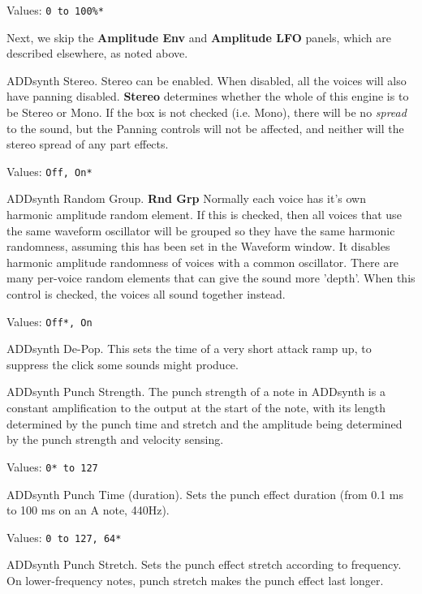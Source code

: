 
   Values: \texttt{0 to 100\%* }

   Next, we skip the \textbf{Amplitude Env} and \textbf{Amplitude LFO}
   panels, which are described elsewhere, as noted above.

   ADDsynth Stereo.
   Stereo can be enabled.
   When disabled, all the voices will also have panning disabled.
   \textbf{Stereo} determines whether the whole of this engine is to be Stereo or
   Mono. If the box is not checked (i.e. Mono), there will be no \textsl{spread}
   to the sound, but the Panning controls will not be affected, and neither will
   the stereo spread of any part effects.

   Values: \texttt{Off, On*}

   ADDsynth Random Group.
   \textbf{Rnd Grp} Normally each voice has it's own harmonic amplitude
   random element. If this is checked, then all voices that use the same waveform
   oscillator will be grouped so they have the same harmonic randomness, assuming
   this has been set in the Waveform window.
   It disables harmonic amplitude randomness of voices with a common oscillator.
   There are many per-voice random elements that can give the sound more
   'depth'. When this control is checked, the voices all sound together
   instead.

   Values: \texttt{Off*, On}

   ADDsynth De-Pop.
   This sets the time of a very short attack ramp up,
   to suppress the click some sounds might produce.

   ADDsynth Punch Strength.
   The punch strength of a note in ADDsynth is a constant amplification to
   the output at the start of the note, with its length determined by the
   punch time and stretch and the amplitude being determined by the punch
   strength and velocity sensing.

   Values: \texttt{0* to 127}

   ADDsynth Punch Time (duration).
   Sets the punch effect duration (from 0.1 ms to 100 ms on an A note, 440Hz).

   Values: \texttt{0 to 127, 64*}

   ADDsynth Punch Stretch.
   Sets the punch effect stretch according to frequency. On lower-frequency
   notes, punch stretch makes the punch effect last longer.


